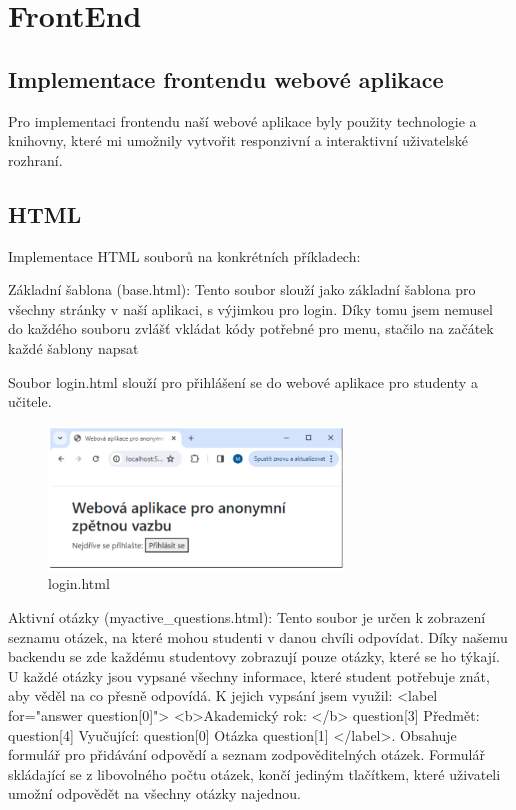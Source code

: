 \documentclass[11pt,a4paper,twoside,openright]{report}
\begin{document}
\chapter{FrontEnd}
\section{Implementace frontendu webové aplikace}
Pro implementaci frontendu naší webové aplikace byly použity technologie a knihovny, které mi umožnily vytvořit responzivní a interaktivní uživatelské rozhraní.
\section{HTML}
Implementace HTML souborů na konkrétních příkladech:

Základní šablona (base.html): Tento soubor slouží jako základní šablona pro všechny stránky v naší aplikaci, s výjimkou pro login. Díky tomu jsem nemusel do každého souboru zvlášť vkládat kódy potřebné pro menu, stačilo na začátek každé šablony napsat {%
Soubor login.html slouží pro přihlášení se do webové aplikace pro studenty a učitele.

\begin{figure}[h]
  \centering
  \includegraphics[width=0.7\textwidth]{login}
  \caption{login.html}
  \label{fig:obrazek}
\end{figure}


Aktivní otázky (myactive\_questions.html): Tento soubor je určen k zobrazení seznamu otázek, na které mohou studenti v danou chvíli odpovídat. Díky našemu backendu se zde každému studentovy zobrazují pouze otázky, které se ho týkají. U každé otázky jsou vypsané všechny informace, které student potřebuje znát, aby věděl na co přesně odpovídá. K jejich vypsání jsem využil: <label for="answer{{ question[0]}}"> <b>Akademický rok: </b> {{ question[3] }} Předmět: {{ question[4] }} Vyučující: {{ question[0] }} Otázka {{ question[1] }}</label>. Obsahuje formulář pro přidávání odpovědí a seznam zodpověditelných otázek. Formulář skládající se z libovolného počtu otázek, končí jediným tlačítkem, které uživateli umožní odpovědět na všechny otázky najednou.


}
\end{document}
